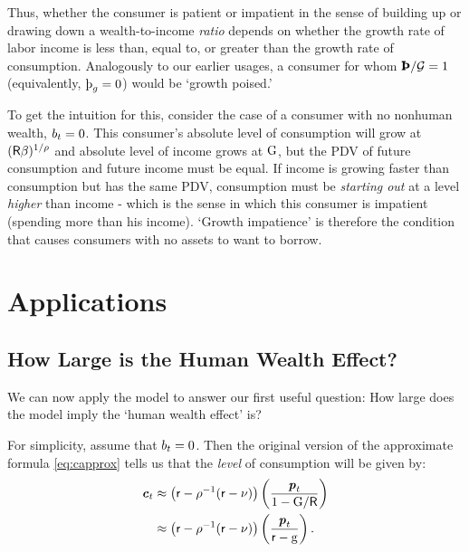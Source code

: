 \documentclass{scrartcl}
\begin{document}
Thus, whether the consumer is patient or impatient in the sense of
building up or drawing down a wealth-to-income \textit{ratio} depends on
whether the growth rate of labor income is less than, equal to, or
greater than the growth rate of consumption.
Analogously to our
earlier usages, a consumer for whom $\GPFac=1$ (equivalently, $\GPRte= 0$) would be `growth poised.'

To get the intuition for this, consider the case of a consumer with no
nonhuman wealth, $b_{t}=0$.
This consumer's absolute level of
consumption will grow at $(\mathsf{R}\beta)^{1/\rho}$ and absolute
level of income grows at ${\mathrm{G}}$, but the PDV of future consumption
and future income must be equal.
If income is growing faster
than consumption but has the same PDV, consumption must be \textit{starting
out} at a level \textit{higher} than income - which is the sense in 
which this consumer is impatient (spending more than his income).
`Growth impatience' is
therefore the condition that causes consumers with no assets to want to borrow.

\section{Applications}

\subsection{How Large is the Human Wealth Effect?} \label{subsec:HWEffect}

We can now apply the model to answer our first useful question: How large does the model 
imply the `human wealth effect' is?


For simplicity, assume that $b_{t} = 0$.
Then the original
version of the approximate formula \eqref{eq:capprox} tells us that the
\textit{level} of consumption will be given by:
\begin{equation}\begin{gathered}\begin{aligned}
        \boldsymbol{\mathit{c}}_{t} & \approx  \left(\mathsf{r} - \rho^{-1}(\mathsf{r}-\nu)\right)\left(\frac{\boldsymbol{\mathit{p}}_{t}}{1-{\mathrm{G}}/\mathsf{R}}\right)  \\
         & \approx  \left(\mathsf{r} - \rho^{-1}(\mathsf{r}-\nu)\right)\left(\frac{\boldsymbol{\mathit{p}}_{t}}{\mathsf{r}-\mathrm{g}}\right). \label{eq:cofw2}
\end{aligned}\end{gathered}\end{equation}
\end{document}
